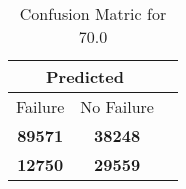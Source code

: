 \begin{table}[] 
\label{Table: Prediction Accuracy-DMD70.0OnlySunEKF-resetReflection-Reflection} 
\caption{Confusion Matric for 70.0} 
\centering 
\begin{tabular} 
 {@{}ccc@{}} 
\toprule 
\multicolumn{2}{c}{\textbf{Predicted}}
 \\ \midrule 
\multicolumn{1}{|c|}{Failure} & 
\multicolumn{1}{c|}{No Failure}
 \\ \midrule 
\multicolumn{1}{|c|}{\color{green}\textbf{89571}} & 
\multicolumn{1}{c|}{\color{green}\textbf{38248}}
 \\ \midrule 
\multicolumn{1}{|c|}{\color{red}\textbf{12750}} & 
\multicolumn{1}{c|}{\color{red}\textbf{29559}}
 \\ \bottomrule 
\end{tabular} 
\end{table} 
